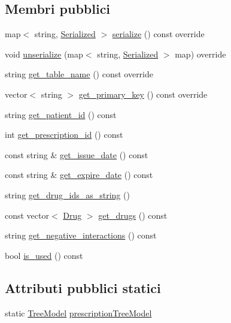\subsection*{Membri pubblici}
\begin{DoxyCompactItemize}
\item 
map$<$ string, \hyperlink{structmm_1_1_serialized}{Serialized} $>$ \hyperlink{classmm_1_1model_1_1_prescription_a592ff88dfa9625a383a7b073a64863b1}{serialize} () const override
\item 
void \hyperlink{classmm_1_1model_1_1_prescription_a6c38e4ee2fca09b18d61aaa214316b9e}{unserialize} (map$<$ string, \hyperlink{structmm_1_1_serialized}{Serialized} $>$ map) override
\item 
string \hyperlink{classmm_1_1model_1_1_prescription_a8de9a927dc92c0e0b15dac6f930889e3}{get\+\_\+table\+\_\+name} () const override
\item 
vector$<$ string $>$ \hyperlink{classmm_1_1model_1_1_prescription_af521915f8872df18ae4a50ff2a4f59ff}{get\+\_\+primary\+\_\+key} () const override
\item 
string \hyperlink{classmm_1_1model_1_1_prescription_a90cbaab7bb67d3d135e622e58a8f108d}{get\+\_\+patient\+\_\+id} () const
\item 
int \hyperlink{classmm_1_1model_1_1_prescription_a6179b066586ebb5a1dc0d8f6a6c11a45}{get\+\_\+prescription\+\_\+id} () const
\item 
const string \& \hyperlink{classmm_1_1model_1_1_prescription_acb29f51441390f5c0e5c483d82ba1514}{get\+\_\+issue\+\_\+date} () const
\item 
const string \& \hyperlink{classmm_1_1model_1_1_prescription_a11c574c3fafddc2e278c8aec417d5977}{get\+\_\+expire\+\_\+date} () const
\item 
string \hyperlink{classmm_1_1model_1_1_prescription_abbc707b103a6f8b52b94fec5ec7ebf89}{get\+\_\+drug\+\_\+ids\+\_\+as\+\_\+string} ()
\item 
const vector$<$ \hyperlink{classmm_1_1model_1_1_drug}{Drug} $>$ \hyperlink{classmm_1_1model_1_1_prescription_a0dbc18b00e03ec68f3d224d11bf75823}{get\+\_\+drugs} () const
\item 
string \hyperlink{classmm_1_1model_1_1_prescription_a1656851efd03bd54f3615d90856e9829}{get\+\_\+negative\+\_\+interactions} () const
\item 
bool \hyperlink{classmm_1_1model_1_1_prescription_a23ae0807248a2cd86232b11927c9eea2}{is\+\_\+used} () const
\end{DoxyCompactItemize}
\subsection*{Attributi pubblici statici}
\begin{DoxyCompactItemize}
\item 
static \hyperlink{structmm_1_1model_1_1_prescription_1_1_tree_model}{Tree\+Model} \hyperlink{classmm_1_1model_1_1_prescription_a5dd928aaafb51cd30d4183df7697ce49}{prescription\+Tree\+Model}
\end{DoxyCompactItemize}


